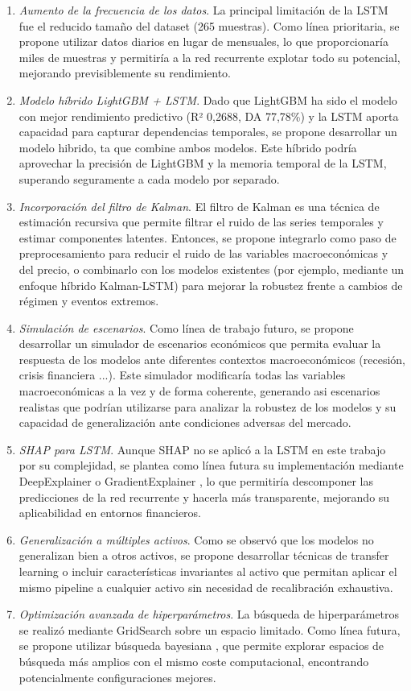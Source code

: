 \begin{enumerate}
    \item \emph{Aumento de la frecuencia de los datos}. La principal limitación de la LSTM fue el reducido tamaño del dataset (265 muestras). Como línea prioritaria, se propone utilizar datos diarios en lugar de mensuales, lo que proporcionaría miles de muestras y permitiría a la red recurrente explotar todo su potencial, mejorando previsiblemente su rendimiento.
    \item \emph{Modelo híbrido LightGBM + LSTM}. Dado que LightGBM ha sido el modelo con mejor rendimiento predictivo (R² 0,2688, DA 77,78\%) y la LSTM aporta capacidad para capturar dependencias temporales, se propone desarrollar un modelo hibrido, ta que combine ambos modelos. Este híbrido podría aprovechar la precisión de LightGBM y la memoria temporal de la LSTM, superando seguramente a cada modelo por separado.
    \item \emph{Incorporación del filtro de Kalman}. El filtro de Kalman \cite{Kalman} es una técnica de estimación recursiva que permite filtrar el ruido de las series temporales y estimar componentes latentes. Entonces, se propone integrarlo como paso de preprocesamiento para reducir el ruido de las variables macroeconómicas y del precio, o combinarlo con los modelos existentes (por ejemplo, mediante un enfoque híbrido Kalman-LSTM) para mejorar la robustez frente a cambios de régimen y eventos extremos.
    \item \emph{Simulación de escenarios}. Como línea de trabajo futuro, se propone desarrollar un simulador de escenarios económicos que permita evaluar la respuesta de los modelos ante diferentes contextos macroeconómicos (recesión, crisis financiera ...). Este simulador modificaría todas las variables macroeconómicas a la vez y de forma coherente, generando asi escenarios realistas que podrían utilizarse para analizar la robustez de los modelos y su capacidad de generalización ante condiciones adversas del mercado.    
    \item \emph{SHAP para LSTM}. Aunque SHAP no se aplicó a la LSTM en este trabajo por su complejidad, se plantea como línea futura su implementación mediante DeepExplainer \cite{DeepExplainer} o GradientExplainer \cite{GradientExplainer}, lo que permitiría descomponer las predicciones de la red recurrente y hacerla más transparente, mejorando su aplicabilidad en entornos financieros.
    \item \emph{Generalización a múltiples activos}. Como se observó que los modelos no generalizan bien a otros activos, se propone desarrollar técnicas de transfer learning o incluir características invariantes al activo que permitan aplicar el mismo pipeline a cualquier activo sin necesidad de recalibración exhaustiva.
    \item \emph{Optimización avanzada de hiperparámetros}. La búsqueda de hiperparámetros se realizó mediante GridSearch sobre un espacio limitado. Como línea futura, se propone utilizar búsqueda bayesiana \cite{BayesianOptimization}, que permite explorar espacios de búsqueda más amplios con el mismo coste computacional, encontrando potencialmente configuraciones mejores.
\end{enumerate}

